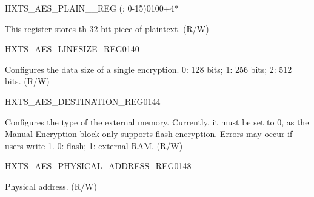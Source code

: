 \begin{register}{H}{XTS\_AES\_PLAIN\_\_REG (: 0-15)}{\hexprefix{}0100+4*}\label{regdesc:XTSAESPLAINNREG}
%
\regnewline%
\begin{regdesc}\begin{reglist}
\label{fielddesc:XTSAESPLAINN}\item [XTS\_AES\_PLAIN\_\regindex{n}] This register stores th 32-bit piece of plaintext. (R/W)
\end{reglist}\end{regdesc}
\end{register}


\begin{register}{H}{XTS\_AES\_LINESIZE\_REG}{\hexprefix{}0140}\label{regdesc:XTSAESLINESIZEREG}
%
%
\regnewline%
\begin{regdesc}\begin{reglist}
\label{fielddesc:XTSAESLINESIZE}\item [XTS\_AES\_LINESIZE] Configures the data size of a single encryption. 0: 128 bits; 1: 256 bits; 2: 512 bits. (R/W)
\end{reglist}\end{regdesc}
\end{register}


\begin{register}{H}{XTS\_AES\_DESTINATION\_REG}{\hexprefix{}0144}\label{regdesc:XTSAESDESTINATIONREG}
%
%
\regnewline%
\begin{regdesc}\begin{reglist}
\label{fielddesc:XTSAESDESTINATION}\item [XTS\_AES\_DESTINATION] Configures the type of the external memory. Currently, it must be set to 0, as the Manual Encryption block only supports flash encryption. Errors may occur if users write 1.
0: flash;
1: external RAM. (R/W)
\end{reglist}\end{regdesc}
\end{register}


\begin{register}{H}{XTS\_AES\_PHYSICAL\_ADDRESS\_REG}{\hexprefix{}0148}\label{regdesc:XTSAESPHYSICALADDRESSREG}
%
%
\regnewline%
\begin{regdesc}\begin{reglist}
\label{fielddesc:XTSAESPHYSICALADDRESS}\item [XTS\_AES\_PHYSICAL\_ADDRESS] Physical address. (R/W)
\end{reglist}\end{regdesc}
\end{register}


